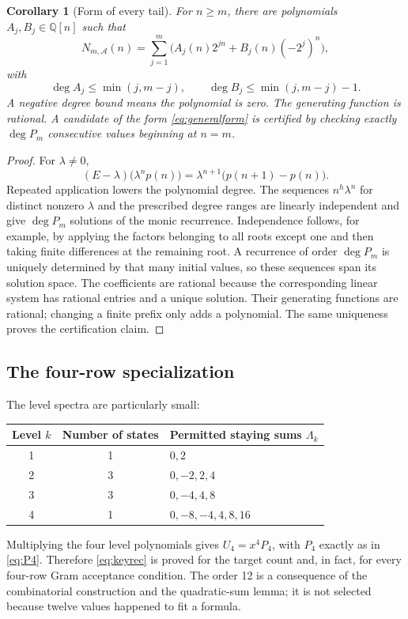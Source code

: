 \documentclass[11pt,letterpaper]{article}
\newtheorem{corollary}[theorem]{Corollary}
\theoremstyle{definition}
\newcommand{\Q}{\mathbb Q}
\newcommand{\1}{\mathbf 1}
\begin{document}
\begin{corollary}[Form of every tail]\label{cor:tail}
For $n\ge m$, there are polynomials $A_j,B_j\in\Q[n]$ such that
\begin{equation}\label{eq:generalform}
 N_{m,\mathcal A}(n)
 =\sum_{j=1}^m\bigl(A_j(n)2^{jn}+B_j(n)(-2^j)^n\bigr),
\end{equation}
with
\[
 \deg A_j\le\min(j,m-j),\qquad
 \deg B_j\le\min(j,m-j)-1.
\]
A negative degree bound means the polynomial is zero. The generating function
is rational. A candidate of the form \eqref{eq:generalform} is certified by
checking exactly $\deg P_m$ consecutive values beginning at $n=m$.
\end{corollary}
\begin{proof}
For $\lambda\ne0$,
\[
 (E-\lambda)\bigl(\lambda^np(n)\bigr)
 =\lambda^{n+1}\bigl(p(n+1)-p(n)\bigr).
\]
Repeated application lowers the polynomial degree. The sequences
$n^h\lambda^n$ for distinct nonzero $\lambda$ and the prescribed degree ranges
are linearly independent and give $\deg P_m$ solutions of the monic recurrence.
Independence follows, for example, by applying the factors belonging to all
roots except one and then taking finite differences at the remaining root.
A recurrence of order $\deg P_m$ is uniquely determined by that many initial
values, so these sequences span its solution space. The coefficients are
rational because the corresponding linear system has rational entries and a
unique solution. Their generating functions are rational; changing a finite
prefix only adds a polynomial. The same uniqueness proves the certification
claim.
\end{proof}

\subsection{The four-row specialization}
The level spectra are particularly small:
\begin{center}
\begin{tabular}{ccl}
\toprule
Level $k$ & Number of states & Permitted staying sums $\Lambda_k$\\
\midrule
1 & 1 & $0,2$\\
2 & 3 & $0,-2,2,4$\\
3 & 3 & $0,-4,4,8$\\
4 & 1 & $0,-8,-4,4,8,16$\\
\bottomrule
\end{tabular}
\end{center}
Multiplying the four level polynomials gives $U_4=x^4P_4$, with $P_4$ exactly
as in \eqref{eq:P4}. Therefore \eqref{eq:keyrec} is proved for the target count
and, in fact, for every four-row Gram acceptance condition. The order 12 is a
consequence of the combinatorial construction and the quadratic-sum lemma;
it is not selected because twelve values happened to fit a formula.
\end{document}
